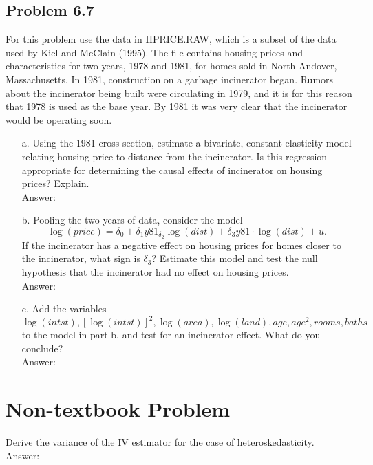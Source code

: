 \documentclass[10pt]{article}
\begin{document}
\subsection*{Problem 6.7}
For this problem use the data in HPRICE.RAW, which is a subset of the data used by Kiel and McClain (1995). The file contains housing prices and characteristics for two years, 1978 and 1981, for homes sold in North Andover, Massachusetts. In 1981, construction on a garbage incinerator began. Rumors about the incinerator being built were circulating in 1979, and it is for this reason that 1978 is used as the base year. By 1981 it was very clear that the incinerator would be operating soon.
\begin{enumerate}
\item[a.] Using the 1981 cross section, estimate a bivariate, constant elasticity model relating housing price to distance from the incinerator. Is this regression appropriate for determining the causal effects of incinerator on housing prices? Explain.
\\ Answer:\\


\item[b.] Pooling the two years of data, consider the model
\[\log(price)=\delta_0+\delta_1y81_\delta_2\log(dist)+\delta_3y81\cdot \log(dist)+u.\]
If the incinerator has a negative effect on housing prices for homes closer to the incinerator, what sign is $\delta_3$? Estimate this model and test the null hypothesis that the incinerator had no effect on housing prices. 
\\ Answer:\\


\item[c.] Add the variables $\log(intst),[\log(intst)]^2,\log(area),\log(land),age,age^2,rooms,baths$ to the model in part b, and test for an incinerator effect. What do you conclude?
\\ Answer:\\

\end{enumerate}

\section*{Non-textbook Problem}
Derive the variance of the IV estimator for the case of heteroskedasticity.
\\ Answer:\\
\end{document}
